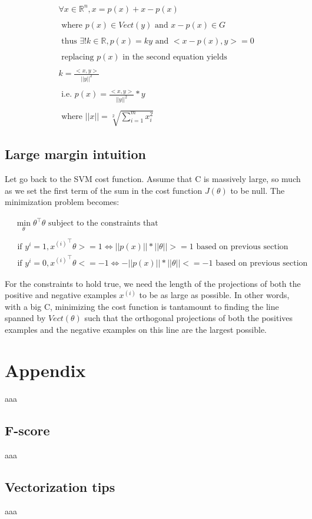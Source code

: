 \documentclass[a4paper, 12pt]{article}
\begin{document}
\begin{align*}
& \forall x \in \mathbb{R}^{n}, x = p(x) + x - p(x) \\
& \\
& \text{ where } p(x) \in Vect(y) \text{ and } x - p(x) \in G \\
& \\
& \text{ thus } \exists! k \in \mathbb{R}, p(x) = ky \text{ and } <x-p(x), y> = 0 \\
& \\
& \text{ replacing } p(x) \text{ in the second equation yields} \\
& \\
& k = \frac{<x, y>}{||y||^{2}} \\
& \\
& \text{ i.e. } p(x) = \frac{<x, y>}{||y||^{2}} * y \\
& \\
& \text{ where } ||x|| = \sqrt[2]{\sum_{i=1}^{m} x_{i}^{2}}
\end{align*}

\subsection{Large margin intuition}
 
Let go back to the SVM cost function. Assume that C is massively large, so much as we set the first term of the sum in the cost function $J(\theta)$ to be null. The minimization problem becomes:

\begin{align*}
& \min_{\theta} \theta^{\top}\theta \text{ subject to the constraints that } \\
& \\
& \text{ if } y^{i} = 1, {x^{(i)}}^{\top}\theta >= 1 \iff ||p(x)||*||\theta|| >= 1 \text{ based on previous section}
& \\
& \text{ if } y^{i} = 0, {x^{(i)}}^{\top}\theta <= -1 \iff  -||p(x)||*||\theta|| <= -1 \text{ based on previous section}
\end{align*} 

For the constraints to hold true, we need the length of the projections of both the positive and negative examples $x^{(i)}$ to be as large as possible. In other words, with a big C, minimizing the cost function is tantamount to finding the line spanned by $Vect(\theta)$ such that the orthogonal projections of both the positives examples and the negative examples on this line are the largest possible.

\section{Appendix}

aaa

\subsection{F-score}

aaa

\subsection{Vectorization tips}

aaa
\end{document}
